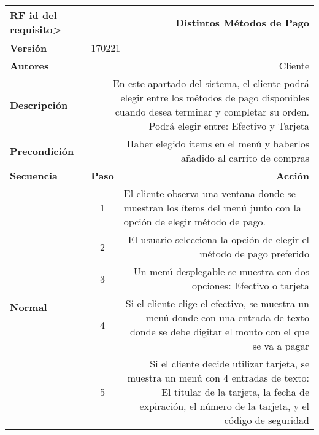 \documentclass[conference]{IEEEtran}
\begin{document}
\begin{table}[H]
  \centering
   \begin{adjustbox}{width=0.45\textwidth}
    \begin{tabular}{|p{11.215em}|r|r|}
    \toprule
    \textbf{RF id del requisito>} & \multicolumn{2}{p{37.355em}|}{\textbf{Distintos Métodos de Pago}} \\
    \midrule
    \textbf{Versión} & \multicolumn{2}{l|}{170221} \\
    \midrule
    \textbf{Autores} & \multicolumn{2}{p{37.355em}|}{Cliente} \\
    \midrule
    \textbf{Descripción} & \multicolumn{2}{p{37.355em}|}{En este apartado del sistema, el cliente podrá elegir entre los métodos de pago disponibles cuando desea terminar y completar su orden. Podrá elegir entre: Efectivo y Tarjeta} \\
    \midrule
    \textbf{Precondición} & \multicolumn{2}{p{37.355em}|}{Haber elegido ítems en el menú y haberlos añadido al carrito de compras} \\
    \midrule
    \textbf{Secuencia} & \multicolumn{1}{p{5.355em}|}{\textbf{Paso}} & \multicolumn{1}{p{32em}|}{\textbf{Acción}} \\
    \midrule
    \multirow{8}[14]{*}{\textbf{Normal}} & \multicolumn{1}{c|}{\multirow{2}[2]{*}{1}} & \multicolumn{1}{l|}{\multirow{2}[2]{*}{El cliente observa una ventana donde se muestran los ítems del menú junto con la opción de elegir método de pago.}} \\
    \multicolumn{1}{|c|}{} &       &  \\
\cmidrule{2-3}    \multicolumn{1}{|c|}{} & \multicolumn{1}{c|}{2} & \multicolumn{1}{p{32em}|}{El usuario selecciona la opción de elegir el método de pago preferido} \\
\cmidrule{2-3}    \multicolumn{1}{|c|}{} & \multicolumn{1}{c|}{3} & \multicolumn{1}{p{32em}|}{Un menú desplegable se muestra con dos opciones: Efectivo o tarjeta} \\
\cmidrule{2-3}    \multicolumn{1}{|c|}{} & \multicolumn{1}{c|}{4} & \multicolumn{1}{p{32em}|}{Si el cliente elige el efectivo, se muestra un menú donde con una entrada de texto donde se debe digitar el monto con el que se va a pagar} \\
\cmidrule{2-3}    \multicolumn{1}{|c|}{} & \multicolumn{1}{c|}{5} & \multicolumn{1}{p{32em}|}{Si el cliente decide utilizar tarjeta, se muestra un menú con 4 entradas de texto: El titular de la tarjeta, la fecha de expiración, el número de la tarjeta, y el código de seguridad} \\

\end{tabular}
\end{adjustbox}
\end{table}
\end{document}

